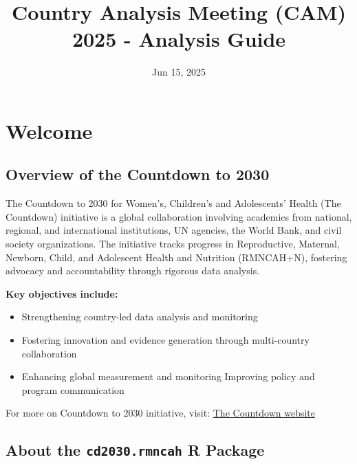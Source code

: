 \documentclass[
  english,
  letterpaper,
  DIV=11,
  numbers=noendperiod]{scrreprt}
\title{Country Analysis Meeting (CAM) 2025 - Analysis Guide}
\author{}
\date{Jun 15, 2025}
\providecommand{\tightlist}{%
  \setlength{\itemsep}{0pt}\setlength{\parskip}{0pt}}
\renewcommand*\contentsname{Table of contents}
\newcommand\contentsname{Table of contents}
\begin{document}
\maketitle

\renewcommand*\contentsname{Table of contents}
{
\hypersetup{linkcolor=}
\setcounter{tocdepth}{2}
\tableofcontents
}


\chapter*{Welcome}\label{welcome}


\section*{Overview of the Countdown to
2030}\label{overview-of-the-countdown-to-2030}


The Countdown to 2030 for Women's, Children's and Adolescents' Health
(The Countdown) initiative is a global collaboration involving academics
from national, regional, and international institutions, UN agencies,
the World Bank, and civil society organizations. The initiative tracks
progress in Reproductive, Maternal, Newborn, Child, and Adolescent
Health and Nutrition (RMNCAH+N), fostering advocacy and accountability
through rigorous data analysis.

\textbf{Key objectives include:}

\begin{itemize}
\tightlist
\item
  Strengthening country-led data analysis and monitoring
\item
  Fostering innovation and evidence generation through multi-country
  collaboration
\item
  Enhancing global measurement and monitoring Improving policy and
  program communication
\end{itemize}

For more on Countdown to 2030 initiative, visit:
\href{https://www.countdown2030.org/about}{The Countdown website}

\section*{\texorpdfstring{About the \texttt{cd2030.rmncah} R
Package}{About the cd2030.rmncah R Package}}\label{about-the-cd2030.rmncah-r-package}
\end{document}
